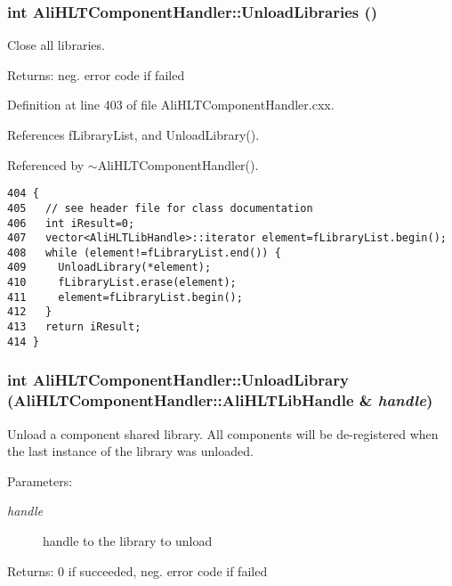 \subsubsection{\setlength{\rightskip}{0pt plus 5cm}int Ali\-HLTComponent\-Handler::Unload\-Libraries ()\hspace{0.3cm}{\tt  [private]}}\label{classAliHLTComponentHandler_d3}


Close all libraries. \begin{Desc}
\item[Returns:]neg. error code if failed \end{Desc}


Definition at line 403 of file Ali\-HLTComponent\-Handler.cxx.

References f\-Library\-List, and Unload\-Library().

Referenced by $\sim$Ali\-HLTComponent\-Handler().

\footnotesize\begin{verbatim}404 {
405   // see header file for class documentation
406   int iResult=0;
407   vector<AliHLTLibHandle>::iterator element=fLibraryList.begin();
408   while (element!=fLibraryList.end()) {
409     UnloadLibrary(*element);
410     fLibraryList.erase(element);
411     element=fLibraryList.begin();
412   }
413   return iResult;
414 }
\end{verbatim}\normalsize 


\subsubsection{\setlength{\rightskip}{0pt plus 5cm}int Ali\-HLTComponent\-Handler::Unload\-Library ({\bf Ali\-HLTComponent\-Handler::Ali\-HLTLib\-Handle} \& {\em handle})\hspace{0.3cm}{\tt  [private]}}\label{classAliHLTComponentHandler_d5}


Unload a component shared library. All components will be de-registered when the last instance of the library was unloaded. \begin{Desc}
\item[Parameters:]
\begin{description}
\item[{\em handle}]handle to the library to unload \end{description}
\end{Desc}
\begin{Desc}
\item[Returns:]0 if succeeded, neg. error code if failed \end{Desc}



